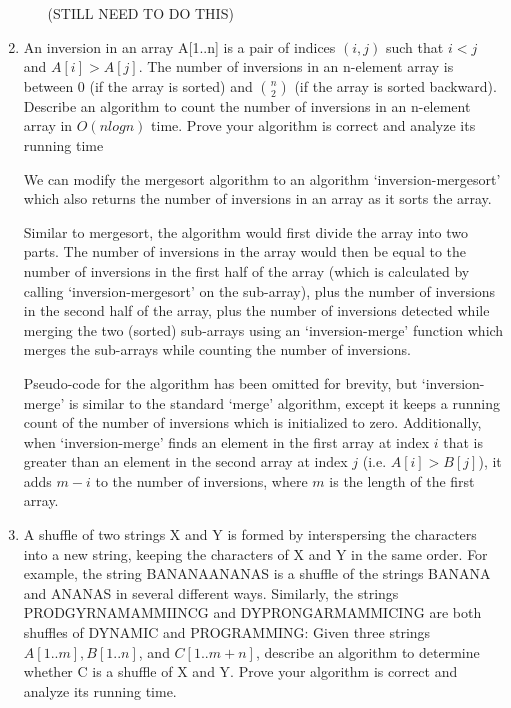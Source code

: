 \documentclass{article}
\begin{document}
\begin{enumerate}
\begin{enumerate}
(STILL NEED TO DO THIS)

    \end{enumerate}

\item 
An inversion in an array A[1..n] is a pair of indices $(i, j)$ such that $i < j$ and
$A[i] > A[j]$. The number of inversions in an n-element array is between 0 (if the array is sorted)
and $n \choose 2$ (if the array is sorted backward). Describe an algorithm to count the number of inversions
in an n-element array in $O(n log n)$ time. Prove your algorithm is correct and analyze its running
time


We can modify the mergesort algorithm to an algorithm `inversion-mergesort' which also returns the number of inversions in an array as it sorts the array.

Similar to mergesort, the algorithm would first divide the array into two parts. 
The number of inversions in the array would then be equal to the number of inversions in the first half of the array (which is calculated by calling `inversion-mergesort' on the sub-array), plus the number of inversions in the second half of the array, plus the number of inversions detected while merging the two (sorted) sub-arrays using an `inversion-merge' function which merges the sub-arrays while counting the number of inversions.

Pseudo-code for the algorithm has been omitted for brevity, but `inversion-merge' is similar to the standard `merge' algorithm, except it keeps a running count of the number of inversions which is initialized to zero. 
Additionally, when `inversion-merge' finds an element in the first array at index $i$ that is greater than an element in the second array at index $j$ (i.e. $A[i] > B[j]$), it adds $m-i$ to the number of inversions, where $m$ is the length of the first array.

\item 
A shuffle of two strings X and Y is formed by interspersing the characters into a new string,
keeping the characters of X and Y in the same order. For example, the string BANANAANANAS
is a shuffle of the strings BANANA and ANANAS in several different ways.
Similarly, the strings PRODGYRNAMAMMIINCG and DYPRONGARMAMMICING are both
shuffles of DYNAMIC and PROGRAMMING:
Given three strings $A[1..m], B[1..n]$, and $C[1..m + n]$, describe an algorithm to determine
whether C is a shuffle of X and Y. Prove your algorithm is correct and analyze its running time.


\end{enumerate}
\end{document}
